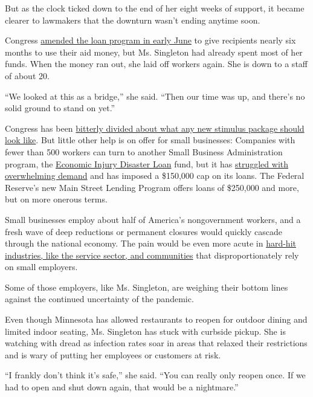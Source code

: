But as the clock ticked down to the end of her eight weeks of support,
it became clearer to lawmakers that the downturn wasn't ending anytime
soon.

Congress
\href{https://www.nytimes3xbfgragh.onion/2020/06/10/business/Small-business-loans-ppp.html}{amended
the loan program in early June} to give recipients nearly six months to
use their aid money, but Ms. Singleton had already spent most of her
funds. When the money ran out, she laid off workers again. She is down
to a staff of about 20.

``We looked at this as a bridge,'' she said. ``Then our time was up, and
there's no solid ground to stand on yet.''

Congress has been
\href{https://www.nytimes3xbfgragh.onion/2020/06/05/business/jobs-economy-recovery-aid.html}{bitterly
divided about what any new stimulus package should look like}. But
little other help is on offer for small businesses: Companies with fewer
than 500 workers can turn to another Small Business Administration
program, the
\href{https://www.sba.gov/funding-programs/loans/coronavirus-relief-options/economic-injury-disaster-loan-emergency-advance}{Economic
Injury Disaster Loan} fund, but it has
\href{https://www.nytimes3xbfgragh.onion/2020/04/09/business/smallbusiness/small-business-disaster-loans-coronavirus.html}{struggled
with overwhelming demand} and has imposed a \$150,000 cap on its loans.
The Federal Reserve's new Main Street Lending Program offers loans of
\$250,000 and more, but on more onerous terms.

Small businesses employ about half of America's nongovernment workers,
and a fresh wave of deep reductions or permanent closures would quickly
cascade through the national economy. The pain would be even more acute
in
\href{https://www.nytimes3xbfgragh.onion/2020/06/17/upshot/coronavirus-spending-rich-poor.html}{hard-hit
industries, like the service sector, and communities} that
disproportionately rely on small employers.

Some of those employers, like Ms. Singleton, are weighing their bottom
lines against the continued uncertainty of the pandemic.

Even though Minnesota has allowed restaurants to reopen for outdoor
dining and limited indoor seating, Ms. Singleton has stuck with curbside
pickup. She is watching with dread as infection rates soar in areas that
relaxed their restrictions and is wary of putting her employees or
customers at risk.

``I frankly don't think it's safe,'' she said. ``You can really only
reopen once. If we had to open and shut down again, that would be a
nightmare.''


